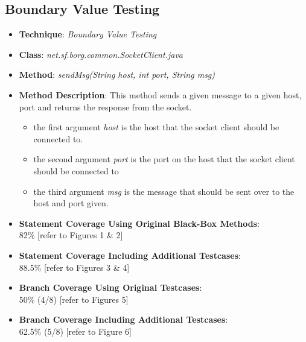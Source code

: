 \documentclass[fontsize=12pt,paper=letter,twoside]{scrartcl}
\begin{document}
\subsection{Boundary Value Testing}
\begin{itemize}
\item \textbf{Technique}: \emph{Boundary Value Testing}
\item \textbf{Class}: \emph{net.sf.borg.common.SocketClient.java}
\item \textbf{Method}: \emph{sendMsg(String host, int port, String msg)}
\item \textbf{Method Description}: This method sends a given message to a given host, port and returns the response from the socket.
\begin{itemize}
\item the first argument \emph{host} is the host that the socket client should be connected to.
\item the second argument \emph{port} is the port on the host that the socket client should be connected to
\item the third argument \emph{msg} is the message that should be sent over to the host and port given.
\end{itemize}

\item \textbf{Statement Coverage Using Original Black-Box Methods}: \\ 82\%  [refer to Figures 1 \& 2]
\item \textbf{Statement Coverage Including Additional Testcases}: \\ 88.5\% [refer to Figures 3 \& 4]

\item \textbf{Branch Coverage Using Original Testcases}: \\ 50\% (4/8) [refer to Figures 5]
\item \textbf{Branch Coverage Including Additional Testcases}: \\ 62.5\% (5/8) [refer to Figure 6]


\end{itemize}
\end{document}
